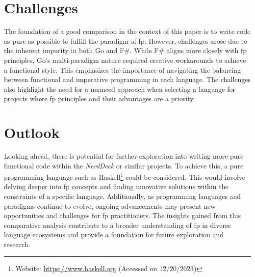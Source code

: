     \section{Challenges}\label{sec:challenges}
    The foundation of a good comparison in the context of this paper is to write code as pure as possible to fulfill the paradigm of \ac{fp}. However, challenges arose due to the inherent impurity in both Go and F\#. While F\# aligns more closely with \ac{fp} principles, Go's multi-paradigm nature required creative workarounds to achieve a functional style. This emphasizes the importance of navigating the balancing between functional and imperative programming in each language. The challenges also highlight the need for a nuanced approach when selecting a language for projects where \ac{fp} principles and their advantages are a priority.        

    \section{Outlook}\label{sec:outlook}
    Looking ahead, there is potential for further exploration into writing more pure functional code within the \textit{NerdDeck} or similar projects. To achieve this, a pure programming language such as Haskell\footnote{Website: \url{https://www.haskell.org} (Accessed on 12/20/2023)} could be considered. This would involve delving deeper into \ac{fp} concepts and finding innovative solutions within the constraints of a specific language. Additionally, as programming languages and paradigms continue to evolve, ongoing advancements may present new opportunities and challenges for \ac{fp} practitioners. The insights gained from this comparative analysis contribute to a broader understanding of \ac{fp} in diverse language ecosystems and provide a foundation for future exploration and research.
